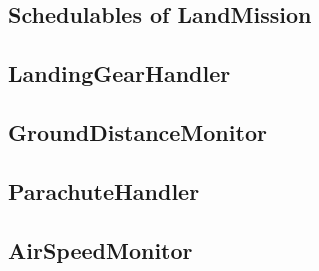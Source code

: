 \documentclass[10pt,a4paper,final]{article}
\begin{document}
\subsection{Schedulables of LandMission}

\subsection{LandingGearHandler}

\newpage

\subsection{GroundDistanceMonitor}

\newpage

\subsection{ParachuteHandler}

\newpage

\subsection{AirSpeedMonitor}

\newpage
\end{document}
